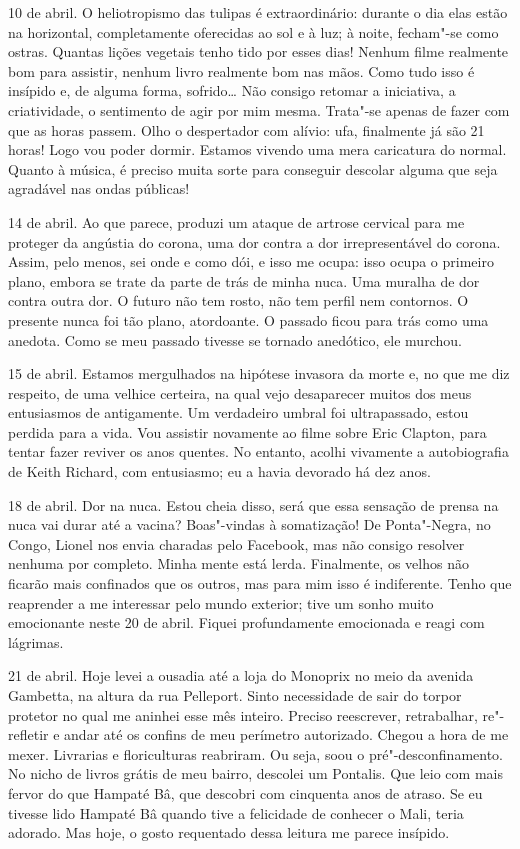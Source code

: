 10 de abril. O heliotropismo das tulipas é extraordinário: durante o dia
elas estão na horizontal, completamente oferecidas ao sol e à luz; à
noite, fecham"-se como ostras. Quantas lições vegetais tenho tido por
esses dias! Nenhum filme realmente bom para assistir, nenhum livro
realmente bom nas mãos. Como tudo isso é insípido e, de alguma forma,
sofrido\ldots{} Não consigo retomar a iniciativa, a criatividade, o
sentimento de agir por mim mesma. Trata"-se apenas de fazer com que as
horas passem. Olho o despertador com alívio: ufa, finalmente já são 21
horas! Logo vou poder dormir. Estamos vivendo uma mera caricatura do
normal. Quanto à música, é preciso muita sorte para conseguir descolar
alguma que seja agradável nas ondas públicas!

14 de abril. Ao que parece, produzi um ataque de artrose cervical para
me proteger da angústia do corona, uma dor contra a dor irrepresentável
do corona. Assim, pelo menos, sei onde e como dói, e isso me ocupa: isso
ocupa o primeiro plano, embora se trate da parte de trás de minha nuca.
Uma muralha de dor contra outra dor. O futuro não tem rosto, não tem
perfil nem contornos. O presente nunca foi tão plano, atordoante. O
passado ficou para trás como uma anedota. Como se meu passado tivesse se
tornado anedótico, ele murchou.

15 de abril. Estamos mergulhados na hipótese invasora da morte e, no que
me diz respeito, de uma velhice certeira, na qual vejo desaparecer
muitos dos meus entusiasmos de antigamente. Um verdadeiro umbral foi
ultrapassado, estou perdida para a vida. Vou assistir novamente ao filme
sobre Eric Clapton, para tentar fazer reviver os anos quentes. No
entanto, acolhi vivamente a autobiografia de Keith Richard, com
entusiasmo; eu a havia devorado há dez anos.

18 de abril. Dor na nuca. Estou cheia disso, será que essa sensação de
prensa na nuca vai durar até a vacina? Boas"-vindas à somatização! De
Ponta"-Negra, no Congo, Lionel nos envia charadas pelo Facebook, mas não
consigo resolver nenhuma por completo. Minha mente está lerda.
Finalmente, os velhos não ficarão mais confinados que os outros, mas
para mim isso é indiferente. Tenho que reaprender a me interessar pelo
mundo exterior; tive um sonho muito emocionante neste 20 de abril.
Fiquei profundamente emocionada e reagi com lágrimas.

21 de abril. Hoje levei a ousadia até a loja do Monoprix no meio da
avenida Gambetta, na altura da rua Pelleport. Sinto necessidade de sair
do torpor protetor no qual me aninhei esse mês inteiro. Preciso
reescrever, retrabalhar, re"-refletir e andar até os confins de meu
perímetro autorizado. Chegou a hora de me mexer. Livrarias e
floriculturas reabriram. Ou seja, soou o pré"-desconfinamento. No nicho
de livros grátis de meu bairro, descolei um Pontalis. Que leio com mais
fervor do que Hampaté Bâ, que descobri com cinquenta anos de atraso. Se
eu tivesse lido Hampaté Bâ quando tive a felicidade de conhecer o Mali,
teria adorado. Mas hoje, o gosto requentado dessa leitura me parece
insípido.

